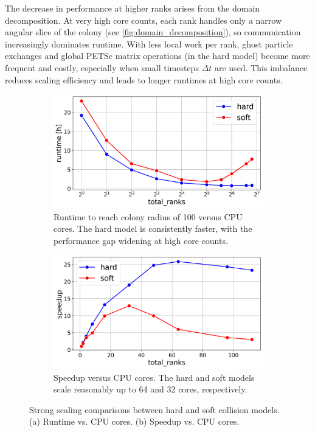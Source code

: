 \documentclass[conference]{IEEEtran}
\begin{document}
The decrease in performance at higher ranks arises from the domain decomposition. At very high core counts, each rank handles only a narrow angular slice of the colony (see \autoref{fig:domain_decomposition}), so communication increasingly dominates runtime. With less local work per rank, ghost particle exchanges and global PETSc matrix operations (in the hard model) become more frequent and costly, especially when small timesteps $\Delta t$ are used. This imbalance reduces scaling efficiency and leads to longer runtimes at high core counts.

\begin{figure}[H]
    \centering
    \begin{subfigure}[b]{1\linewidth}
        \includegraphics[width=\linewidth]{figures/runtimes/strong_scaling_runtime_hard_soft.png}
        \caption{Runtime to reach colony radius of 100 versus CPU cores. The hard model is consistently faster, with the performance gap widening at high core counts.}
        \label{fig:runtime_hard_soft}
    \end{subfigure}
    \begin{subfigure}[b]{1\linewidth}
        \includegraphics[width=\linewidth]{figures/runtimes/strong_scaling_speedup_hard_soft.png}
        \caption{Speedup versus CPU cores. The hard and soft models scale reasonably up to 64 and 32 cores, respectively.}
        \label{fig:speedup_hard_soft}
    \end{subfigure}
    \caption{Strong scaling comparisons between hard and soft collision models. (a) Runtime vs. CPU cores. (b) Speedup vs. CPU cores.}
\end{figure}
\end{document}
